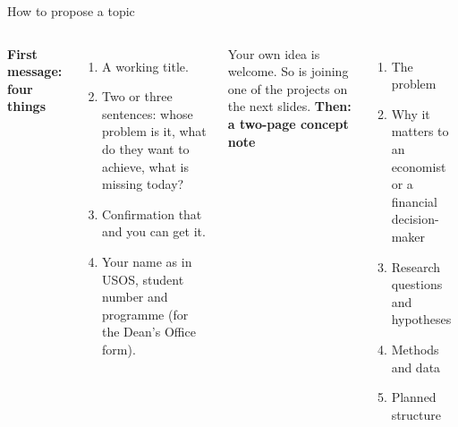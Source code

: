 \documentclass[aspectratio=169,11pt,t]{beamer}
\begin{document}
\begin{frame}{How to propose a topic}
  \begin{columns}[T,onlytextwidth]
    \textbf{First message: four things}
    \begin{enumerate}
      \item A working title.
      \item Two or three sentences: whose problem is it, what do they want to achieve, what is
            missing today?
      \item Confirmation that  and you can get it.
      \item Your name as in USOS, student number and programme (for the Dean's Office form).
    \end{enumerate}
    \medskip
    Your own idea is welcome. So is joining one of the projects on the next slides.
    \textbf{Then: a two-page concept note}
    \begin{enumerate}
      \item The problem
      \item Why it matters to an economist or a financial decision-maker
      \item Research questions and hypotheses
      \item Methods and data
      \item Planned structure
    \end{enumerate}
    \medskip
  \end{columns}
\end{frame}
\end{document}
